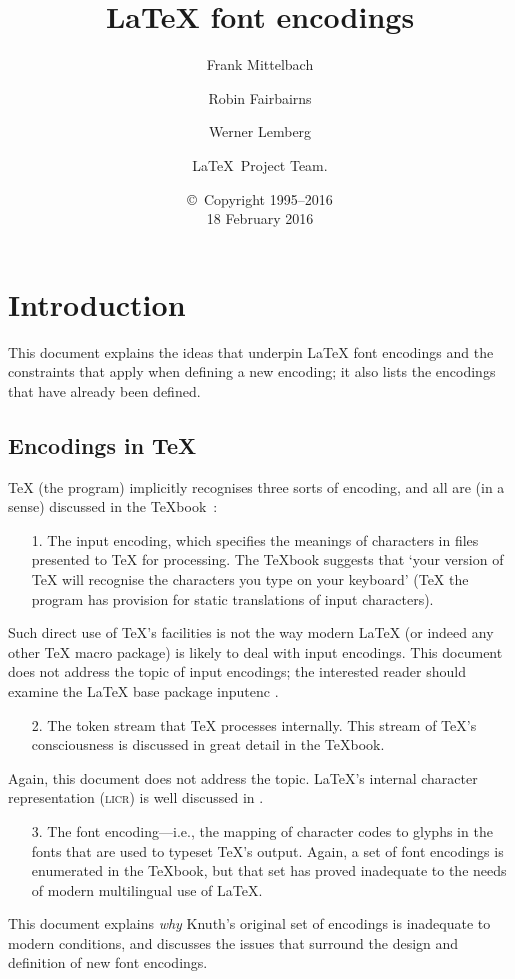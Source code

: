 \documentclass{ltxguide}[1994/11/20]
\title{\LaTeX{} font encodings}
\author{Frank Mittelbach \and Robin
   Fairbairns \and Werner Lemberg \and \LaTeX\ Project Team.}
\date{\copyright~Copyright 1995--2016 \\[5pt] 18 February 2016}
\providecommand{\Pkg}[1]{%
  \textsf{#1}}
\begin{document}
\maketitle

\tableofcontents

\section{Introduction}

This document explains the ideas that underpin \LaTeX{} font
encodings and the constraints that apply when defining a new encoding; it
also lists the encodings that have already been defined.

\subsection{Encodings in \TeX{}}

\TeX{} (the program) implicitly recognises three sorts of encoding,
and all are (in a sense) discussed in the \TeX{}book~\cite{A-W:DKn86}:
\begin{itemize}
\item[1.] The input encoding, which specifies the meanings of characters
  in files presented to \TeX{} for processing.  The \TeX{}book
  suggests that `your version of \TeX{} will recognise the characters
  you type on your keyboard' (\TeX{} the program has provision for
  static translations of input characters).
\end{itemize}
Such direct use of \TeX{}'s facilities is not the way modern
\LaTeX{} (or indeed any other \TeX{} macro package) is likely to deal
with input encodings.   This document does not address the topic of
input encodings; the interested reader should examine the \LaTeX{}
base package \Pkg{inputenc} \cite[sec.~7.5.2, p.~357]{A-W:MG2004}.
\begin{itemize}
\item[2.] The token stream that \TeX{} processes internally.  This stream
  of \TeX{}'s consciousness is discussed in great detail in the
  \TeX{}book.
\end{itemize}
Again, this document does not address the topic.  \LaTeX's internal
character representation (\textsc{licr}) is well discussed in
\cite[sec.~7.11.2, p.~442]{A-W:MG2004}.
\begin{itemize}
\item[3.] The font encoding---i.e., the mapping of character codes to
  glyphs in the fonts that are used to typeset \TeX{}'s output.
  Again, a set of font encodings is enumerated in the \TeX{}book, but
  that set has proved inadequate to the needs of modern multilingual
  use of \LaTeX.
\end{itemize}
This document explains \emph{why} Knuth's original set of encodings is
inadequate to modern conditions, and discusses the issues that
surround the design and definition of new font encodings.
\end{document}
